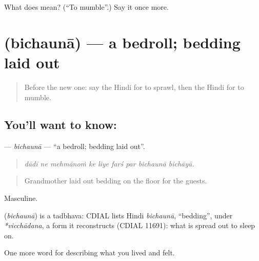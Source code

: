 \begin{tcolorbox}[breakable,colback=teal!4,colframe=teal!35!black,title={Before you move on}]
What does  mean? (\textquotedblleft{}To mumble\textquotedblright{}.) Say it once more.
\end{tcolorbox}
\section[\texorpdfstring{\hi{बिछौना} (bichaunā)}{बिछौना (bichaunā)}]{ (bichaunā) — a bedroll; bedding laid out}

\label{lesson:HI-C496-bichauna}



\begin{quote}
Before the new one: say the Hindi for to sprawl, then the Hindi for to mumble.
\end{quote}

\subsection*{You'll want to know: }
\textbf{} — \emph{bichaunā} — \textquotedblleft{}a bedroll; bedding laid out\textquotedblright{}.

\begin{quote}
        
\end{quote}

\begin{quote}
\emph{dādī ne mehmānoṁ ke liye farś par bichaunā bichāyā.}
\end{quote}

\begin{quote}
Grandmother laid out bedding on the floor for the guests.
\end{quote}

Masculine.

\begin{cousinweb}
\textbf{} (\emph{bichaunā}) is a tadbhava: CDIAL lists Hindi \emph{bichaunā}, \textquotedblleft{}bedding\textquotedblright{}, under \emph{*vicchādana}, a form it reconstructs (CDIAL 11691): what is spread out to sleep on.
\end{cousinweb}

\begin{grammarlens}[title={What you've built}]
One more word for describing what you lived and felt.
\end{grammarlens}

